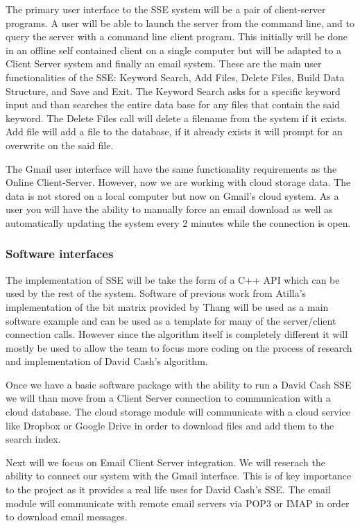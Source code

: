 \documentclass[onecolumn, draftclsnofoot,10pt, compsoc]{IEEEtran}
\begin{document}
The primary user interface to the SSE system will be a pair of client-server programs. A user will be able to launch the server from the command line, and to query the server with a command line client program. This initially will be done in an offline self contained client on a single computer but will be adapted to a Client Server system and finally an email system. These are the main user functionalities of the SSE: Keyword Search, Add Files, Delete Files, Build Data Structure, and Save and Exit. The Keyword Search asks for a specific keyword input and than searches the entire data base for any files that contain the said keyword. The Delete Files call will delete a filename from the system if it exists. Add file will add a file to the database, if it already exists it will prompt for an overwrite on the said file.

The Gmail user interface will have the same functionality requirements as the Online Client-Server. However, now we are working with cloud storage data. The data is not stored on a local computer but now on Gmail's cloud system. As a user you will have the ability to manually force an email download as well as automatically updating the system every 2 minutes while the connection is open.

\subsubsection{ Software interfaces }

The implementation of SSE will be take the form of a C++ API which can be used by the rest of the system. Software of previous work from Atilla's implementation of the bit matrix provided by Thang will be used as a main software example and can be used as a template for many of the server/client connection calls. However since the algorithm itself is completely different it will mostly be used to allow the team to focus more coding on the process of research and implementation of David Cash's algorithm. 

Once we have a basic software package with the ability to run a David Cash SSE we will than move from a Client Server connection to communication with a cloud database. The cloud storage module will communicate with a cloud service like Dropbox or Google Drive in order to download files and add them to the search index.

Next will we focus on Email Client Server integration. We will reserach the ability to connect our system with the Gmail interface. This is of key importance to the project as it provides a real life uses for David Cash's SSE. The email module will communicate with remote email servers via POP3 or IMAP in order to download email messages.
\end{document}
